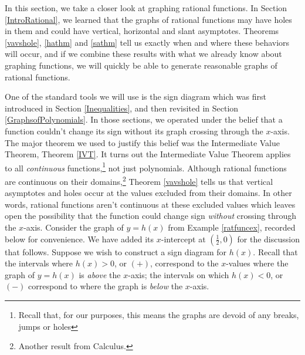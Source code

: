 
\setcounter{footnote}{0}

\label{RationalGraphs}

In this section, we take a closer look at graphing rational functions.  In Section \ref{IntroRational}, we learned that the graphs of rational functions may have holes in them and could have vertical, horizontal and slant asymptotes.  Theorems \ref{vavshole}, \ref{hathm} and \ref{sathm} tell us exactly when and where these behaviors will occur, and if we combine these results with what we already know about graphing functions, we will quickly be able to generate reasonable graphs of rational functions.  

\smallskip

One of the standard tools we will use is the sign diagram which was first introduced in Section \ref{Inequalities}, and then revisited in Section \ref{GraphsofPolynomials}.  In those sections, we operated under the belief that a function couldn't change its sign without its graph crossing through the $x$-axis.  The major theorem we used to justify this belief was the Intermediate Value Theorem, Theorem \ref{IVT}.   It turns out the Intermediate Value Theorem applies to all \textit{continuous} functions,\footnote{Recall that, for our purposes, this means the graphs are devoid of any breaks, jumps or holes} not just polynomials. Although rational functions are continuous on their domains,\footnote{Another result from Calculus.} Theorem \ref{vavshole} tells us that vertical asymptotes and holes occur at the values excluded from their domains.  In other words, rational functions aren't continuous at these excluded values which leaves open the possibility that the function could change sign \textit{without} crossing through the $x$-axis.  Consider the graph of $y=h(x)$ from Example \ref{ratfuncex}, recorded below for convenience.  We have added its $x$-intercept at $\left(\frac{1}{2},0\right)$ for the discussion that follows. Suppose we wish to construct a sign diagram for $h(x)$.    Recall that the intervals where $h(x)>0$, or $(+)$, correspond to the $x$-values where the graph of $y=h(x)$ is \textit{above} the $x$-axis; the intervals on which $h(x) < 0$, or $(-)$ correspond to where the graph is \textit{below} the $x$-axis.  

\smallskip

